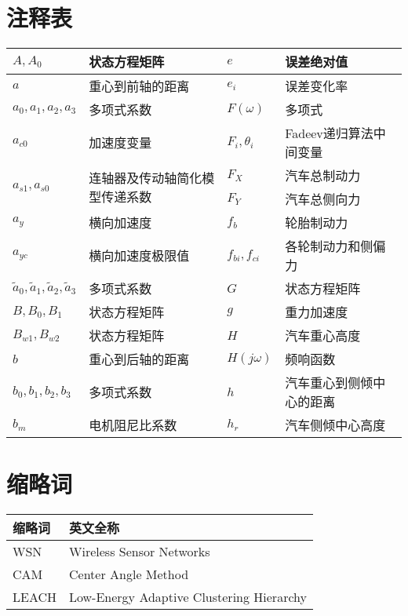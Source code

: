
\chapter*{注释表}

\noindent\begin{tabularx}{\textwidth}{|X|p{5cm}|X|p{5cm}|}\hline
$A, A_0$ & 状态方程矩阵 & $e$ & 误差绝对值 \\ \hline
$a$ & 重心到前轴的距离 & $e_i$ & 误差变化率 \\ \hline
$a_0, a_1, a_2, a_3$ & 多项式系数 & $F(\omega)$ & 多项式 \\ \hline
$a_{c0}$ & 加速度变量 & $F_i, \theta _i$ & Fadeev递归算法中间变量 \\ \hline

\multirow{2}{*}{$a_{s1}, a_{s0}$} & \multirow{2}{5cm}{连轴器及传动轴简化模型传递系数} &
$F_X$ & 汽车总制动力 \\ \cline{3-4}
& & $F_Y$ & 汽车总侧向力 \\ \hline

$a_y$ & 横向加速度 & $f_b$ & 轮胎制动力 \\ \hline
$a_{yc}$ & 横向加速度极限值 & $f_{bi}, f_{ci}$ & 各轮制动力和侧偏力 \\ \hline
$\tilde{a}_0, \tilde{a}_1, \tilde{a}_2, \tilde{a}_3$ & 多项式系数 & $G$ & 状态方程矩阵 \\ \hline
$B, B_0, B_1$ & 状态方程矩阵 & $g$ & 重力加速度 \\ \hline
$B_{w1}, B_{w2}$ & 状态方程矩阵 & $H$ & 汽车重心高度 \\ \hline
$b$ & 重心到后轴的距离 & $H(j \omega)$ & 频响函数 \\ \hline
$b_0, b_1, b_2, b_3$ & 多项式系数 & $h$ & 汽车重心到侧倾中心的距离 \\ \hline
$b_m$ &电机阻尼比系数 & $h_r$ & 汽车侧倾中心高度 \\ \hline
\end{tabularx}

\chapter*{缩略词}

\noindent\begin{tabularx}{\textwidth}{|C{2cm}|Y|}\hline
缩略词 & 英文全称 \\ \hline
WSN & Wireless Sensor Networks \\ \hline
CAM & Center Angle Method \\ \hline
LEACH & Low-Energy Adaptive Clustering Hierarchy \\ \hline
\end{tabularx}
